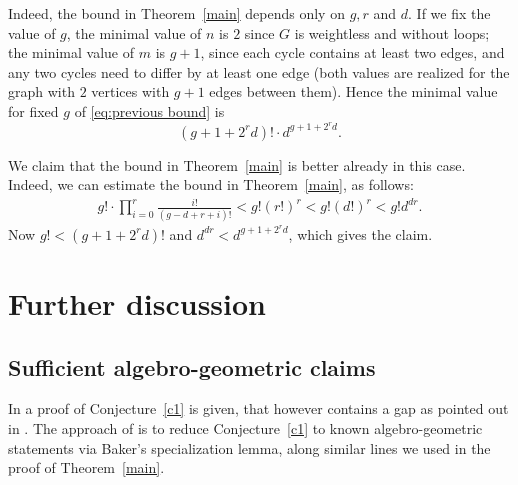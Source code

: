 \documentclass[11pt]{amsart}
\begin{document}
Indeed, the bound in Theorem~\ref{main} depends only on $g, r$ and $d$. If we fix the value of $g$, the minimal value of $n$ is $2$ since $G$ is weightless and without loops; the minimal value of $m$ is $g + 1$, since each cycle contains at least two edges, and any two cycles need to differ by at least one edge (both values are realized for the graph with $2$ vertices with $g  + 1$ edges between them). Hence the minimal value for fixed $g$ of \eqref{eq:previous bound} is \[ (g + 1 + 2^r d)! \cdot d^{g + 1 + 2^r d}.\]


We claim that the bound in Theorem~\ref{main} is better already in this case. Indeed, we can estimate the bound in Theorem~\ref{main}, as follows:
\begin{eqnarray*}\label{eq:comparison}
 g! \cdot \prod_{i=0}^r \frac{i!}{(g-d+r+i)!} < g! (r!)^r < g! (d!)^r < g! d^{dr}.
\end{eqnarray*}
Now $g ! < (g + 1 + 2^r d)!$ and $d^{dr} < d^{g + 1 + 2^r d}$, which gives the claim. 

\section{Further discussion} \label{sec:further discussion}
\subsection{Sufficient algebro-geometric claims}\label{sufficiency} In \cite[Theorem 6.3]{MR2895184} a proof of Conjecture~\ref{c1} is given, that however contains a gap as pointed out in \cite[Footnote 5, p. 379]{MR3702316}. The approach of \cite[Theorem 6.3]{MR2895184} is to reduce Conjecture~\ref{c1} to known algebro-geometric statements via Baker's specialization lemma, along similar lines we used in the proof of Theorem~\ref{main}.  
\end{document}
